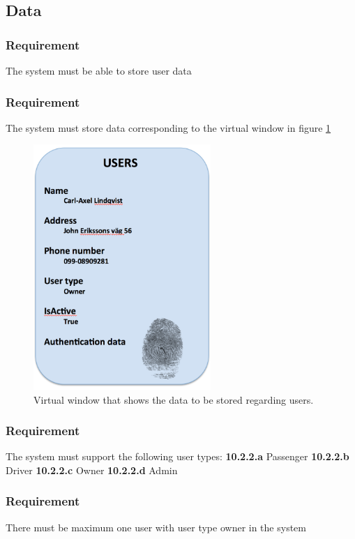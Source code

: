 \documentclass{article}
\begin{document}
{  \subsection{Data}
      \subsubsection{Requirement}
\hfill \break 
\- \- \-The system must be able to store user data
      \subsubsection{Requirement}
\hfill \break 
\- \- \-The system must store data corresponding to the virtual window in figure \ref{vw1}
\begin{figure}[htb]   
 \centering
 \includegraphics[width=0.6\textwidth]
    {VirtualWindow1.png}
  \caption{Virtual window that shows the data to be stored regarding users.}
  \label{vw1}
\end{figure}
      \subsubsection{Requirement}
\hfill \break 
\- \- \-The system must support the following user types:
\hfill \break 
\indent
\textbf{10.2.2.a} Passenger
\hfill \break 
\indent
\textbf{10.2.2.b} Driver
\hfill \break 
\indent
\textbf{10.2.2.c} Owner
\hfill \break 
\indent
\textbf{10.2.2.d} Admin
      \subsubsection{Requirement}
\hfill \break 
\- \- \-There must be maximum one user with user type owner in the system
}
\end{document}
